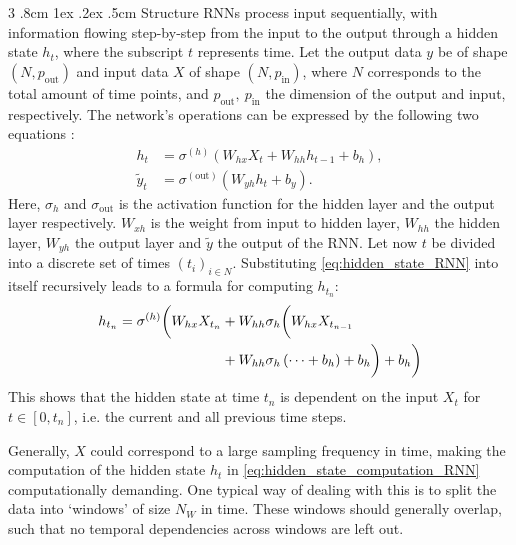 \documentclass[%
reprint,
amsmath,amssymb,
aps,
]{revtex4-2}
\makeatletter
\renewcommand{\subsubsection}{%
	\@startsection
	{subsubsection}%
	{3}%
	{\z@}%
	{.8cm \@plus1ex \@minus .2ex}%
	{.5cm}%
	{\normalfont\small\centering}%
}
\makeatother
\begin{document}
\subsubsection{Structure}
RNNs process input sequentially, with information flowing step-by-step from the input to the output through a hidden state \(h_t\), where the subscript \(t\) represents time. Let the output data \(y\) be of shape \((N, p_{\text{out}})\) and input data \(X\) of shape \((N, p_{\text{in}})\), where \(N\) corresponds to the total amount of time points, and \(p_{\text{out}}, \ p_{\text{in}}\) the dimension of the output and input, respectively. The network's operations can be expressed by the following two equations \cite{tallec2017unbiasingtruncatedbackpropagationtime}:
\begin{subequations}
\begin{align}
	h_{t} &= \sigma^{(h)}\left(W_{hx}X_{t} + W_{hh}h_{t-1}  + b_{h}\right), \label{eq:hidden_state_RNN} \\
	\tilde{y}_{t} &= \sigma^{(\text{out})}\left(W_{yh}h_{t} + b_{y}\right).	\label{eq:output_RNN}
\end{align}
\end{subequations}
Here, \(\sigma_h\) and \(\sigma_{\text{out}}\) is the activation function for the hidden layer and the output layer respectively. \(W_{xh}\) is the weight from input to hidden layer, \(W_{hh}\) the hidden layer, \(W_{yh}\) the output layer and \(\tilde{y}\) the output of the RNN. Let now \(t\) be divided into a discrete set of times \((t_i)_{i\in N}\). Substituting \eqref{eq:hidden_state_RNN} into itself recursively leads to a formula for computing \(h_{t_n}\):
\begin{align}	\label{eq:hidden_state_computation_RNN}
	h_{t_n} = \sigma^{(h)}\biggl( W_{hx}X_{t_n} &+ W_{hh}\sigma_h \biggl( W_{hx}X_{t_{n-1}} \notag\\
	&+ W_{hh}\sigma_h \left(\dots + b_h\right) + b_h\biggr) 
	+b_h\biggr)
\end{align}
This shows that the hidden state at time \(t_n\) is dependent on the input \(X_{t}\) for \(t\in[0, t_n]\), i.e. the current and all previous time steps. 

Generally, \(X\) could correspond to a large sampling frequency in time, making the computation of the hidden state \(h_t\) in \eqref{eq:hidden_state_computation_RNN} computationally demanding. One typical way of dealing with this is to split the data into `windows' of size \(N_{W}\) in time. These windows should generally overlap, such that no temporal dependencies across windows are left out. 
\end{document}
